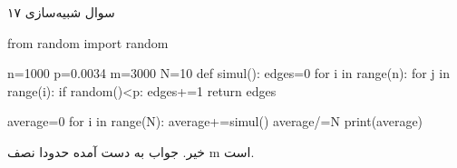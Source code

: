 سوال شبیه‌سازی ۱۷

\begin{latin}
\begin{python}
from random import random

n=1000
p=0.0034
m=3000
N=10
def simul():
	edges=0
	for i in range(n):
		for j in range(i):
			if random()<p:
				edges+=1
	return edges

average=0
for i in range(N):
	average+=simul()
average/=N
print(average)
\end{python}
\end{latin}

خیر. جواب به دست آمده حدودا نصف m است.

